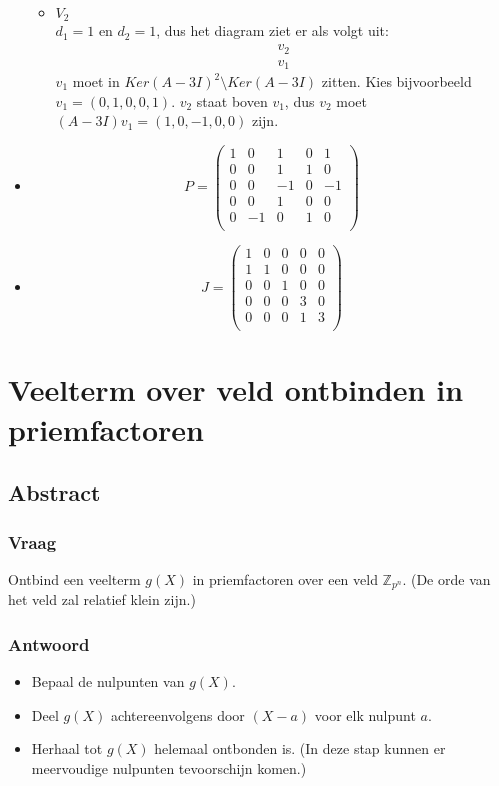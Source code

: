 \documentclass[main.tex]{subfiles}
\begin{document}
\begin{itemize}
\begin{itemize}
  \item $V_{2}$\\
    $d_{1} = 1$ en $d_{2} = 1$, dus het diagram ziet er als volgt uit:
    \[
    \begin{array}{c}
      \boxed{v_{2}}\\
      \boxed{v_{1}}
    \end{array}
    \]
    $v_{1}$ moet in $Ker(A-3I)^{2}\setminus Ker(A-3I)$ zitten.
    Kies bijvoorbeeld $v_{1}= (0,1,0,0,1)$.
    $v_{2}$ staat boven $v_{1}$, dus $v_{2}$ moet $(A-3I)v_{1}= (1,0,-1,0,0)$ zijn.

  \end{itemize}
\item 
  \[ P = 
  \left(
    \begin{array}{ccc|cc}
      1 & 0 & 1 & 0 & 1\\
      0 & 0 & 1 & 1 & 0\\
      0 & 0 & -1& 0 &-1\\
      0 & 0 & 1 & 0 & 0\\
      0 & -1& 0 & 1 & 0\\
    \end{array}
  \right)
  \]
\item 
  \[ J =
  \left(
    \begin{array}{ccc|cc}
      1 & 0 & 0 & 0 & 0\\
      1 & 1 & 0 & 0 & 0\\
      0 & 0 & 1 & 0 & 0\\\hline
      0 & 0 & 0 & 3 & 0\\
      0 & 0 & 0 & 1 & 3\\
    \end{array}
  \right)
  \]
\end{itemize}

\newpage
\section{Veelterm over veld ontbinden in priemfactoren}

\subsection*{Abstract}
\subsubsection*{Vraag}
Ontbind een veelterm $g(X)$ in priemfactoren over een veld $\mathbb{Z}_{p^{n}}$.
(De orde van het veld zal relatief klein zijn.)
\subsubsection*{Antwoord}
\begin{itemize}
\item Bepaal de nulpunten van $g(X)$.
\item Deel $g(X)$ achtereenvolgens door $(X-a)$ voor elk nulpunt $a$.
\item Herhaal tot $g(X)$ helemaal ontbonden is. (In deze stap kunnen er meervoudige nulpunten tevoorschijn komen.)\end{itemize}
\end{document}
